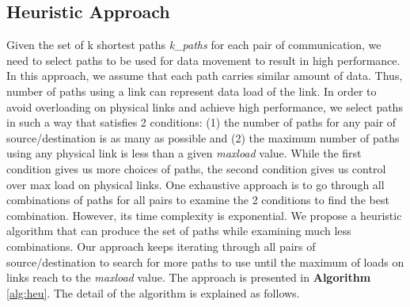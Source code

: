 \subsection{Heuristic Approach}

Given the set of k shortest paths \textit{k\_paths} for each pair of communication, we need to select paths to be used for data movement to result in high performance. In this approach, we assume that each path carries similar amount of data. Thus, number of paths using a link can represent data load of the link. In order to avoid overloading on physical links and achieve high performance, we select paths in such a way that satisfies 2 conditions: (1) the number of paths for any pair of source/destination is as many as possible and (2) the maximum number of paths using any physical link is less than a given \textit{maxload} value. While the first condition gives us more choices of paths, the second condition gives us control over max load on physical links. One exhaustive approach is to go through all combinations of paths for all pairs to examine the 2 conditions to find the best combination. However, its time complexity is exponential. We propose a heuristic algorithm that can produce the set of paths while examining much less combinations. Our approach keeps iterating through all pairs of source/destination to search for more paths to use until the maximum of loads on links reach to the \textit{maxload} value. The approach is presented in \textbf{Algorithm} \ref{alg:heu}. The detail of the algorithm is explained as follows.

